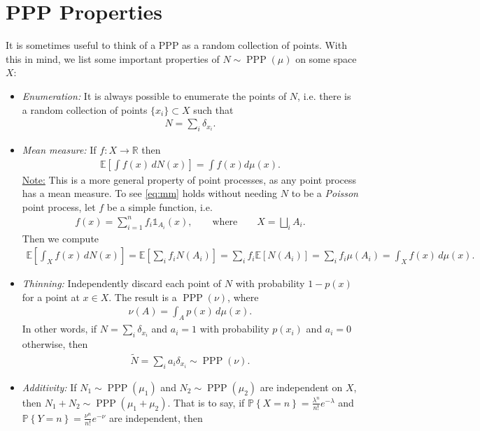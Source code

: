 \documentclass[11pt]{article}
\begin{document}
\section{PPP Properties}
It is sometimes useful to think of a PPP as a random collection of points. With this in mind, we list some important properties of $N\sim \operatorname{PPP}(\mu)$ on some space $X$:
\begin{itemize}
	\item \emph{Enumeration:} It is always possible to enumerate the points of $N$, i.e. there is a random collection of points $\{x_i\}\subset X$ such that
	\begin{align}
		N = \sum_i \delta_{x_i}.
	\end{align}
	\item \emph{Mean measure:} If $f\colon X \to \mathbb{R}$ then 
	\begin{align}\label{eq:mm}
		\mathbb{E}\left[ \int\! f(x) \, dN(x) \right] = \int f(x) d\mu(x).
	\end{align}
	\underline{Note:} This is a more general property of point processes, as any point process has a mean measure. To see \eqref{eq:mm} holds without needing $N$ to be a \emph{Poisson} point process, let $f$ be a simple function, i.e.
	\begin{align}
		f(x) = \sum_{i=1}^n f_i \mathds{1}_{A_i}(x), \qquad\text{where}\qquad X = \bigsqcup_i A_i.
	\end{align}
	Then we compute
	\begin{align}
		\mathbb{E}\left[ \int_X\! f(x) \, dN(x) \right] = \mathbb{E}\left[ \sum_i f_i N(A_i) \right] = \sum_i f_i \mathbb{E}\left[ N(A_i) \right] = \sum_i f_i \mu(A_i) = \int_X \! f(x) \, d\mu(x).
	\end{align}
	\item \emph{Thinning:} Independently discard each point of $N$ with probability $1-p(x)$ for a point at $x\in X$. The result is a $\operatorname{PPP}(\nu)$, where
	\begin{align}\label{eq:thin}
		\nu(A) = \int_A\! p(x) \, d\mu(x).
	\end{align}
	In other words, if $N = \sum_i \delta_{x_i}$ and $a_i = 1$ with probability $p(x_i)$ and $a_i = 0$ otherwise, then
	\begin{align}
		\widetilde{N} = \sum_i a_i \delta_{x_i} \sim \operatorname{PPP}(\nu).
	\end{align}
	\item \emph{Additivity:} If $N_1 \sim \operatorname{PPP}(\mu_1)$ and $N_2 \sim \operatorname{PPP}(\mu_2)$ are independent on $X$, then $N_1 + N_2 \sim \operatorname{PPP}(\mu_1 + \mu_2)$. That is to say, if $\mathbb{P}\left\{ X = n \right\} = \frac{\lambda^n}{n!}e^{-\lambda}$ and $\mathbb{P}\left\{ Y = n \right\} = \frac{\nu^n}{n!}e^{-\nu}$ are independent, then

\end{itemize}
\end{document}
